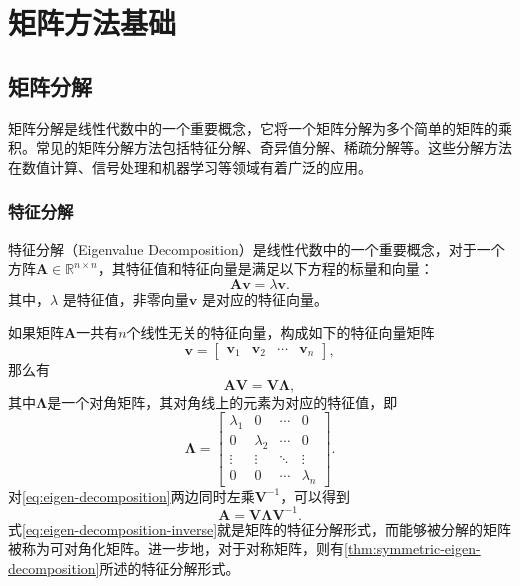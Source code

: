 \chapter{矩阵方法基础}

\section{矩阵分解}
矩阵分解是线性代数中的一个重要概念，它将一个矩阵分解为多个简单的矩阵的乘积。常见的矩阵分解方法包括特征分解、奇异值分解、稀疏分解等。这些分解方法在数值计算、信号处理和机器学习等领域有着广泛的应用。

\subsection{特征分解}
特征分解（Eigenvalue Decomposition）是线性代数中的一个重要概念，对于一个方阵\( \mathbf{A} \in \mathbb{R}^{n \times n} \)，其特征值和特征向量是满足以下方程的标量和向量：
\begin{equation}
    \mathbf{A} \bm{v} = \lambda \bm{v}.
\end{equation}
其中，\( \lambda \) 是特征值，非零向量\( \bm{v} \) 是对应的特征向量。

如果矩阵\( \mathbf{A} \)一共有\( n \)个线性无关的特征向量，构成如下的特征向量矩阵
\[
    \bm{v} =
    \begin{bmatrix}
        \bm{v}_1 & \bm{v}_2 & \cdots & \bm{v}_n
    \end{bmatrix},
\]
那么有
\begin{equation}
    \mathbf{A} \mathbf{V} = \mathbf{V} \mathbf{\Lambda},
    \label{eq:eigen-decomposition}
\end{equation}
其中\( \mathbf{\Lambda} \)是一个对角矩阵，其对角线上的元素为对应的特征值，即
\[
    \mathbf{\Lambda} =
    \begin{bmatrix}
        \lambda_1 & 0         & \cdots & 0         \\
        0         & \lambda_2 & \cdots & 0         \\
        \vdots    & \vdots    & \ddots & \vdots    \\
        0         & 0         & \cdots & \lambda_n
    \end{bmatrix}.
\]
对\cref{eq:eigen-decomposition}两边同时左乘\( \mathbf{V}^{-1} \)，可以得到
\begin{equation}
    \mathbf{A} = \mathbf{V} \mathbf{\Lambda} \mathbf{V}^{-1}.
    \label{eq:eigen-decomposition-inverse}
\end{equation}
式\cref{eq:eigen-decomposition-inverse}就是矩阵的特征分解形式，而能够被分解的矩阵被称为可对角化矩阵。进一步地，对于对称矩阵，则有\cref{thm:symmetric-eigen-decomposition}所述的特征分解形式。

